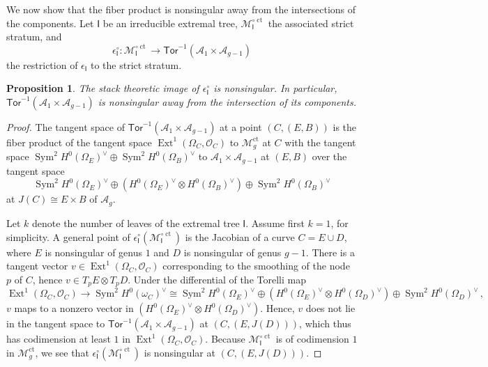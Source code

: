 \documentclass[11pt]{amsart}
\newtheorem{prop}[thm]{Proposition}
\theoremstyle{definition}
\newcommand{\M}{\mathcal{M}}
\newcommand{\A}{\mathcal{A}}
\renewcommand{\O}{\mathcal{O}}
\DeclareMathOperator{\ct}{ct}
\DeclareMathOperator{\Ext}{Ext}
\newcommand{\Tor}{\mathsf{Tor}}
\DeclareMathOperator{\Sym}{Sym}
\begin{document}
{We now show that the fiber product is nonsingular away from the intersections of the components. Let $\mathsf{I}$ be an irreducible extremal tree, $\M_{\mathsf{I}}^{\circ \ct}$ the associated strict stratum, and 
\[
\epsilon^{\circ}_{\mathsf{I}}:\M^{\circ \ct}_{\mathsf{I}}\rightarrow \Tor^{-1}(\A_1\times \A_{g-1})
\]
the restriction of $\epsilon_{\mathsf{I}}$ to the strict stratum.
\begin{prop} \label{strictns}
    The stack theoretic image of $\epsilon^{\circ}_{\mathsf{I}}$ is nonsingular. In particular, $\Tor^{-1}(\A_1\times \A_{g-1})$ is nonsingular away from the intersection of its components. 
\end{prop}
\begin{proof}

    The tangent space of $\Tor^{-1}(\A_1\times \A_{g-1})$ at a point $(C,(E, B))$ is the fiber product of the tangent space $\Ext^1(\Omega_C,\O_C)$ to $\M_g^{\ct}$ at $C$ with the tangent space $\Sym^2 H^0(\Omega_E)^{\vee}\oplus \Sym^2 H^0(\Omega_B)^{\vee}$ to $\A_1\times \A_{g-1}$ at $(E,B)$ over the tangent space $$\Sym^2 H^0(\Omega_E)^{\vee}\oplus (H^0(\Omega_E)^{\vee}\otimes H^0(\Omega_B)^{\vee})  \oplus \Sym^2 H^0(\Omega_B)^{\vee}$$  at $J(C)\cong E\times B$ of $\A_g$. 
    
    Let $k$ denote the number of leaves of the extremal tree $\mathsf{I}$. 
    Assume first $k=1$, for simplicity. A general point of $\epsilon_{\mathsf{I}}^{\circ}(\M^{\circ \ct}_{\mathsf{I}})$ is the Jacobian of a curve $C=E\cup D$, where $E$ is nonsingular of genus $1$ and $D$ is nonsingular of genus $g-1$. There is a tangent vector $v\in \Ext^1(\Omega_C,\O_C)$ corresponding to the smoothing of the node $p$ of $C$, hence $v\in T_pE \otimes T_pD$. %
    Under the differential of the Torelli map
    \[
    \Ext^1(\Omega_C,\O_C)\rightarrow \Sym^2 H^0(\omega_C)^{\vee}\cong \Sym^2 H^0(\Omega_E)^{\vee}\oplus (H^0(\Omega_E)^{\vee}\otimes H^0(\Omega_{D})^{\vee})  \oplus \Sym^2 H^0(\Omega_D)^{\vee}\,,
    \]
    $v$ maps to a nonzero vector in $(H^0(\Omega_E)^{\vee}\otimes H^0(\Omega_{D})^{\vee})$. Hence, $v$ does not lie in the tangent space to $\Tor^{-1}(\A_1\times \A_{g-1})$ at $(C, (E,J(D)))$, which thus has codimension at least $1$ in $\Ext^1(\Omega_C,\O_C)$. Because $\M^{\circ \ct}_{\mathsf{I}}$ is of codimension $1$ in $\M_g^{\ct}$, we see that $\epsilon_{\mathsf{I}}^{\circ}(\M^{\circ \ct}_{\mathsf{I}})$ is nonsingular at $(C,(E,J(D)))$. 
    

\end{proof}}
\end{document}
